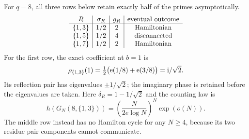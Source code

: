 \begin{remark}
For \(q=8\), all three rows below retain exactly half of
the primes asymptotically.
\[
 \begin{array}{c|c|c|c}
 R&\sigma_R&g_R&\hbox{eventual outcome}\\ \hline
 \{1,3\}&1/2&2&\hbox{Hamiltonian}\\
 \{1,5\}&1/2&4&\hbox{disconnected}\\
 \{1,7\}&1/2&2&\hbox{Hamiltonian}
 \end{array}
\]
For the first row, the exact coefficient at \(b=1\) is
\[
 \rho_{\{1,3\}}(1)
 =\tfrac12\bigl(\mathrm e(1/8)+\mathrm e(3/8)\bigr)
 =\mathrm{i}/\sqrt2 .
\]
Its reflection pair has eigenvalues \(\pm1/\sqrt2\);
the imaginary phase is retained before the eigenvalues are
taken. Here \(\delta_R=1-1/\sqrt2\) and the counting law is
\[
 h(G_N(8,\{1,3\}))
   =\left(\frac{N}{2e\log N}\right)^N\exp(o(N)).
\]
The middle row instead has no Hamilton cycle for any
\(N\geq4\), because its two residue-pair components cannot
communicate.
\end{remark}
